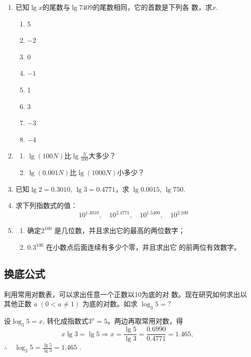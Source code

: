 \begin{ex}
\begin{enumerate}
    \item 已知$\lg x$的尾数与$\lg 7409$的尾数相同，它的首数是下列各
    数，求$x$.
\begin{multicols}{4}
\begin{enumerate}[(1)]
    \item 5
    \item $-2$
    \item 0
    \item $-1$
    \item 1
    \item 3
    \item $-3$
    \item $-4$
\end{enumerate}
\end{multicols}
\item \begin{enumerate}[(1)]
    \item $\lg (100N)$比$\lg\frac{N}{100}$大多少？
    \item $\lg(0.001N)$比$\lg(1000N)$小多少？
\end{enumerate}
\item 已知$\lg 2=0.3010$, $\lg3=0.4771$，求
$\lg0.0015$, $\lg750$.
\item 求下列指数式的值：
\[10^{1.3010},\quad 10^{2.4771},\quad 10^{1.5400},\quad 10^{2.100}\]
\item \begin{enumerate}[(1)]
    \item 确定$2^{100}$
    是几位数，并且求出它的最高的两位数字；
\item $0.3^{100}$    在小数点后面连续有多少个零，并且求出它
    的前两位有效数字。
\end{enumerate}
\end{enumerate}
\end{ex}

\subsection{换底公式}
利用常用对数表，可以求出任意一个正数以10为底的对
数。现在研究如何求出以其他正数
$a\; (0<a\ne 1)$
为底的对数。如求
$\log_3 5=?$

设$\log_{3}5=x$, 转化成指数式$3^{x}=5$。两边再取常用对数，得
$$x\lg3=\lg5\Longrightarrow x=\frac{\lg5}{\lg3}=\frac{0.6990}{0.4771}=1.465,$$
$\therefore \quad \log_3 5= \frac {\lg 5}{\lg 3}= 1.465 $ .

